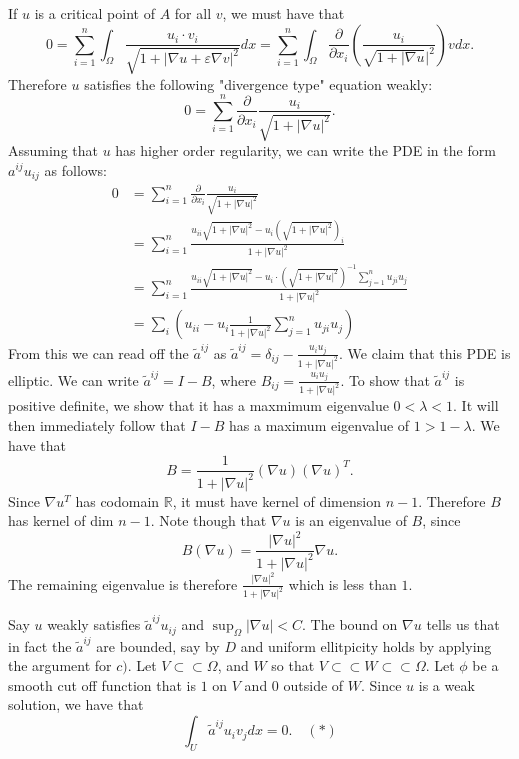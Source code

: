 \documentclass[12pt, a4paper]{article}
\theoremstyle{definition}
\newcommand{\R}{\mathbb{R}}                           %
\newcommand{\grad}{\nabla}
\newcommand{\ep}{\varepsilon}
\begin{document}
\item If $u$ is a critical point of $A$ for all $v$, we must have that 
$$0 = \sum_{i=1}^n \int_{\Omega} \frac{u_i \cdot v_i}{\sqrt{1 + |\grad u + \ep \grad v|^2}}dx =\sum_{i=1}^n \int_{\Omega} \frac{\partial}{\partial x_i} \left(\frac{u_i}{\sqrt{1+|\grad u}|^2} \right)v dx.$$
Therefore $u$ satisfies the following "divergence type" equation weakly:
$$0 = \sum_{i=1}^n \frac{\partial}{\partial x_i} \frac{u_i}{\sqrt{1+ |\grad u|^2}}.$$
Assuming that $u$ has higher order regularity, we can write the PDE in the form $a^{ij}u_{ij}$ as follows: 
\begin{align*}0 &= \sum_{i=1}^n \frac{\partial}{\partial x_i} \frac{u_i}{\sqrt{1+ |\grad u|^2}}  
	\\ & = \sum_{i=1}^n \frac{u_{ii} \sqrt{1+ |\grad u|^2} - u_i \left(\sqrt{1+ |\grad u|^2} \right)_i }{ 1+ |\grad u|^2 } 
	\\ & = \sum_{i=1}^n \frac{u_{ii} \sqrt{1+ |\grad u|^2}- u_i \cdot (\sqrt{1+ |\grad u|^2})^{-1} \sum_{j=1}^n u_{ji}u_j} {1+|\grad u|^2}
	\\ & = \sum_{i} \left( u_{ii} -  u_i \frac{1}{1+ |\grad u|^2 } \sum_{j=1}^n u_{ji} u_j  \right)
\end{align*}
From this we can read off the $\tilde{a}^{ij}$ as $\tilde{a}^{ij} = \delta_{ij}  - \frac{u_i u_j}{1+|\grad u|^2 }$. We claim that this PDE is elliptic. We can write $\tilde{a}^{ij} =I - B$, where $B_{ij} = \frac{u_i u_j}{1 + |\grad u|^2}$. To show that $\tilde{a}^{ij}$ is positive definite, we show that it has a maxmimum eigenvalue $0<\lambda <1$. It will then immediately follow that $I -B$ has a maximum eigenvalue of $1>1 - \lambda$. We have that 
$$B = \frac{1}{1+|\grad u|^2} (\grad u) (\grad u)^T.$$
Since $\grad u ^T$ has codomain $\R$, it must have kernel of dimension $n-1$. Therefore $B$ has kernel of dim $n-1$. Note though that $\grad u$ is an eigenvalue of $B$, since 
$$B (\grad u) = \frac{|\grad u|^2}{1+|\grad u|^2} \grad u.$$ 
The remaining eigenvalue is therefore $\frac{|\grad u|^2}{1+|\grad u|^2}$ which is less than $1$.
\item Say $u$ weakly satisfies $\tilde{a}^{ij}u_{ij}$ and $\sup_{\Omega}|\grad u| <C$. The bound on $\grad u$ tells us that in fact the $\tilde{a}^{ij}$ are bounded, say by $D$ and uniform ellitpicity holds by applying the argument for $c)$. Let $V \subset \subset \Omega$, and $W$ so that $V \subset \subset W \subset \subset \Omega$. Let $\phi$ be a smooth cut off function that is $1$ on $V$ and $0$ outside of $W$. Since $u$ is a weak solution, we have that 
$$\int_U \tilde{a}^{ij}u_i v_j dx = 0. \quad (*)$$
\end{document}
